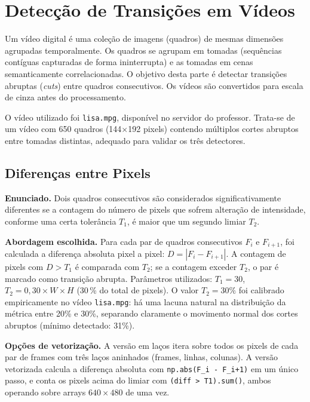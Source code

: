 \documentclass[12pt,a4paper]{article}
\newcommand{\campo}[2]{\textbf{#1.} #2\par}
\begin{document}
\section{Detecção de Transições em Vídeos}
\label{sec:video}

Um vídeo digital é uma coleção de imagens (quadros) de mesmas dimensões agrupadas
temporalmente. Os quadros se agrupam em tomadas (sequências contíguas capturadas de forma
ininterrupta) e as tomadas em cenas semanticamente correlacionadas. O objetivo desta parte
é detectar transições abruptas (\textit{cuts}) entre quadros consecutivos. Os vídeos são
convertidos para escala de cinza antes do processamento.

O vídeo utilizado foi \texttt{lisa.mpg}, disponível no servidor do professor.
Trata-se de um vídeo com 650 quadros (144$\times$192 pixels) contendo múltiplos cortes
abruptos entre tomadas distintas, adequado para validar os três detectores.

\subsection{Diferenças entre Pixels}

\campo{Enunciado}{Dois quadros consecutivos são considerados significativamente diferentes
se a contagem do número de pixels que sofrem alteração de intensidade, conforme uma certa
tolerância $T_1$, é maior que um segundo limiar $T_2$.}

\campo{Abordagem escolhida}{Para cada par de quadros consecutivos $F_i$ e $F_{i+1}$, foi
calculada a diferença absoluta pixel a pixel: $D = |F_i - F_{i+1}|$. A contagem de pixels
com $D > T_1$ é comparada com $T_2$; se a contagem exceder $T_2$, o par é marcado como
transição abrupta. Parâmetros utilizados: $T_1 = 30$, $T_2 = 0{,}30 \times W \times H$
(30\,\% do total de pixels). O valor $T_2 = 30\%$ foi calibrado empiricamente no vídeo
\texttt{lisa.mpg}: há uma lacuna natural na distribuição da métrica entre 20\% e 30\%,
separando claramente o movimento normal dos cortes abruptos (mínimo detectado: 31\%).}

\campo{Opções de vetorização}{A versão em laços itera sobre todos os pixels de cada par de
frames com três laços aninhados (frames, linhas, colunas). A versão vetorizada calcula a
diferença absoluta com \texttt{np.abs(F\_i - F\_{i+1})} em um único passo, e conta os
pixels acima do limiar com \texttt{(diff > T1).sum()}, ambos operando sobre arrays
$640\times480$ de uma vez.}
\end{document}
